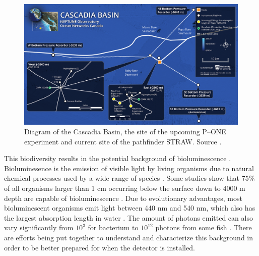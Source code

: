 \begin{figure}
  \centering
  \includegraphics[width=.9\textwidth]{./Figures/cascadia_basin.png}
  \caption{Diagram of the Cascadia Basin, the site of the upcoming P--ONE experiment and current site of the pathfinder STRAW. Source \cite{onc}.}
  \label{fig:casc}
\end{figure}

This biodiversity results in the potential background of bioluminescence \cite{pone,onc,biolum,biolum_rec}. Bioluminesence is the emission of visible light by living organisms due to natural chemical processes used by a wide range of species \cite{biolum}. Some studies show that 75\% of all organisms larger than 1 cm occurring below the surface down to 4000 m depth are capable of bioluminescence \cite{biolum_rec}. Due to evolutionary advantages, most bioluminescent organisms emit light between 440 nm and 540 nm, which also has the largest absorption length in water \cite{biolum}. The amount of photons emitted can also vary significantly from $10^{3}$ for bacterium to $10^{12}$ photons from some fish \cite{biolum}. There are efforts being put together to understand and characterize this background in order to be better prepared for when the detector is installed.



